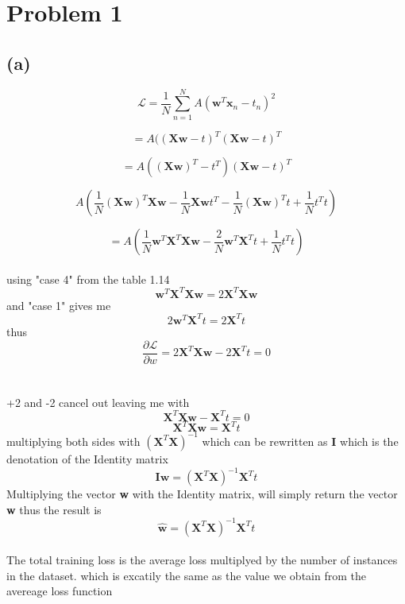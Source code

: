 \section{Problem 1}
\subsection{(a)}
$$ \mathcal{L} = \frac{1}{N} \sum\limits_{n=1}^{N} A(\mathbf{w}^{T} \mathbf{x}_{n} - t_{n})^2 $$ 

$$  = A((\textbf{Xw}-t)^{T} (\textbf{Xw}-t)^{T} $$

$$  = A((\textbf{Xw})^{T} - t^{T}) (\textbf{Xw}-t)^{T} $$

$$ A(\frac{1}{N} (\textbf{Xw})^{T} \textbf{Xw}- \frac{1}{N} \textbf{Xw} t^{T}  - \frac{1}{N} (\textbf{Xw})^{T} t + \frac{1}{N} t^{T}t )$$

$$  = A(\frac{1}{N}\textbf{w}^{T} \textbf{X}^{T} \textbf{Xw} - \frac{2}{N}\textbf{w}^{T}\textbf{X}^T t + \frac{1}{N}t^{T}t) $$
\\
using "case 4" from the table 1.14 
$$\textbf{w}^{T} \textbf{X}^{T} \textbf{Xw} = 2\textbf{X}^{T}\textbf{Xw} $$
and "case 1" gives me
$$2\textbf{w}^{T}\textbf{X}^Tt = 2\textbf{X}^{T} t$$
thus
$$\frac{\partial\mathcal{L}}{\partial w} = 2\textbf{X}^{T}\textbf{Xw} - 2\textbf{X}^{T} t = 0$$
\\
\\
+2 and -2 cancel out leaving me with 
$$ \textbf{X}^{T}\textbf{Xw} - \textbf{X}^{T} t = 0 $$
$$ \textbf{X}^{T}\textbf{Xw} = \textbf{X}^{T} t $$
multiplying both sides with $ (\textbf{X}^{T}\textbf{X})^{-1} $
which can be rewritten as \textbf{I} which is the denotation of the Identity matrix
$$ \textbf{I}\textbf{w} = (\textbf{X}^{T}\textbf{X})^{-1} \textbf{X}^{T} t $$
Multiplying the vector \textbf{w} with the Identity matrix, will simply return the vector \textbf{w} thus the result is
$$ \hat{\textbf{w}} = (\textbf{X}^{T}\textbf{X})^{-1} \textbf{X}^{T} t $$
\\
The total training loss is the average loss multiplyed by the number of instances in the dataset.  
which is excatily the same as the value we obtain from the avereage loss function